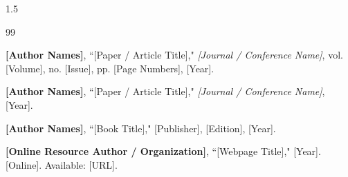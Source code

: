 \renewcommand{\bibname}{REFERENCES}
\cleardoublepage
{}
\begin{spacing}{1.5}
\begin{thebibliography}{99}

 \textbf{[Author Names]}, ``[Paper / Article Title]," \textit{[Journal / Conference Name]}, vol. [Volume], no. [Issue], pp. [Page Numbers], [Year].

 \textbf{[Author Names]}, ``[Paper / Article Title]," \textit{[Journal / Conference Name]}, [Year].

 \textbf{[Author Names]}, ``[Book Title]," [Publisher], [Edition], [Year].

 \textbf{[Online Resource Author / Organization]}, ``[Webpage Title]," [Year]. [Online]. Available: [URL].

\end{thebibliography}
\end{spacing}
	
\nocite{*}
